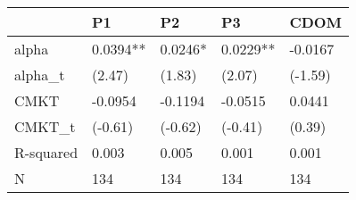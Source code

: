 \begin{tabular}{lllll}
\toprule
 & P1 & P2 & P3 & CDOM \\
\midrule
alpha & 0.0394** & 0.0246* & 0.0229** & -0.0167 \\
alpha_t & (2.47) & (1.83) & (2.07) & (-1.59) \\
CMKT & -0.0954 & -0.1194 & -0.0515 & 0.0441 \\
CMKT_t & (-0.61) & (-0.62) & (-0.41) & (0.39) \\
R-squared & 0.003 & 0.005 & 0.001 & 0.001 \\
N & 134 & 134 & 134 & 134 \\
\bottomrule
\end{tabular}
